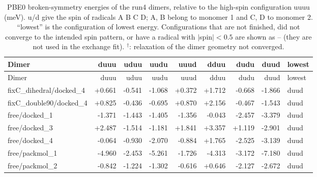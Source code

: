 
\begin{longtable}{@{}lrrrrrrrl@{}}
\caption{PBE0 broken-symmetry energies of the run4 dimers, relative to the high-spin
         configuration uuuu (meV). u/d give the spin of radicals A B C D; A, B belong to monomer 1 and
         C, D to monomer 2. ``lowest'' is the configuration of lowest energy. Configurations that are not
         finished, did not converge to the intended spin pattern, or have a radical with $|$spin$|<0.5$ are
         shown as -- (they are not used in the exchange fit).
         $^{\dagger}$: relaxation of the dimer geometry not converged.}\label{tab:run4_bs_energies}\\
\toprule
Dimer & duuu & uduu & uudu & uuud & dduu & dudu & duud & lowest \\
\midrule
\endfirsthead
\toprule
Dimer & duuu & uduu & uudu & uuud & dduu & dudu & duud & lowest \\
\midrule
\endhead
\bottomrule
\endlastfoot
fixC\_dihedral/docked\_4 & +0.661 & -0.541 & -1.068 & +0.372 & +1.712 & -0.668 & -1.866 & duud \\
fixC\_double90/docked\_4 & +0.825 & -0.436 & -0.695 & +0.870 & +2.156 & -0.467 & -1.543 & duud \\
free/docked\_1 & -1.371 & -1.443 & -1.405 & -1.356 & -0.043 & -2.457 & -3.379 & duud \\
free/docked\_3 & +2.487 & -1.514 & -1.181 & +1.841 & +3.357 & +1.119 & -2.901 & duud \\
free/docked\_4 & -0.064 & -0.930 & -2.070 & -0.884 & +1.765 & -2.525 & -3.139 & duud \\
free/packmol\_1 & -4.960 & -2.453 & -5.261 & -1.726 & -4.313 & -3.172 & -7.180 & duud \\
free/packmol\_2 & -0.842 & -1.224 & -1.302 & -0.616 & +0.646 & -2.127 & -2.672 & duud \\
\end{longtable}

